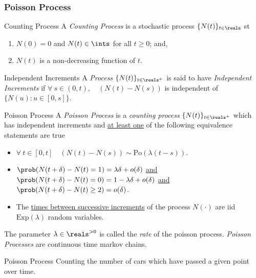 \documentclass[11pt,a4paper]{article}
\begin{document}
\subsubsection{Poisson Process}

\begin{definition}{Counting Process}
  A \textit{Counting Process} is a stochastic process $\{N(t)\}_{t\in\reals}$ st
  \begin{enumerate}
    \item $N(0)=0$ and $N(t)\in\ints$ for all $t\geq0$; and,
    \item $N(t)$ is a non-decreasing function of $t$.
  \end{enumerate}
\end{definition}

\begin{definition}{Independent Increments}
  A \textit{Process} $\{N(t)\}_{t\in\reals^+}$ is said to have \textit{Independent Increments} if $\forall\ s\in(0,t),\quad(N(t)-N(s))$ is independent of $\{N(u):u\in[0,s]\}$.
\end{definition}


\begin{definition}{Poisson Process}
  A \textit{Poisson Process} is a \textit{counting process} $\{N(t)\}_{t\in\reals^+}$ which has independent increments and \underline{at least one} of the following equivalence statements are true
  \begin{itemize}
    \item $\forall\ t\in[0,t]\quad(N(t)-N(s))\sim\text{Po}(\lambda(t-s))$.
    \item $\prob(N(t+\delta)-N(t)=1)=\lambda\delta+o(\delta)$ \underline{and}\\
    $\prob(N(t+\delta)-N(t)=0)=1-\lambda\delta+o(\delta)$ \underline{and}\\
    $\prob(N(t+\delta)-N(t)\geq2)=o(\delta)$.
    \item The \underline{times between successive increments} of the process $N(\cdot)$ are iid $\text{Exp}(\lambda)$ random variables.
  \end{itemize}
  The parameter $\lambda\in\reals^{>0}$ is called the \textit{rate} of the poisson process. \textit{Poisson Processes} are continuous time markov chains.
\end{definition}

\begin{example}{Poisson Process}
  Counting the number of cars which have passed a given point over time.
\end{example}
\end{document}
